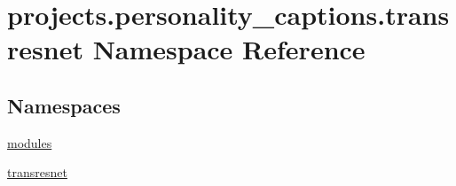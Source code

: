 \hypertarget{namespaceprojects_1_1personality__captions_1_1transresnet}{}\section{projects.\+personality\+\_\+captions.\+transresnet Namespace Reference}
\label{namespaceprojects_1_1personality__captions_1_1transresnet}
\subsection*{Namespaces}
\begin{DoxyCompactItemize}
\item 
 \hyperlink{namespaceprojects_1_1personality__captions_1_1transresnet_1_1modules}{modules}
\item 
 \hyperlink{namespaceprojects_1_1personality__captions_1_1transresnet_1_1transresnet}{transresnet}
\end{DoxyCompactItemize}

